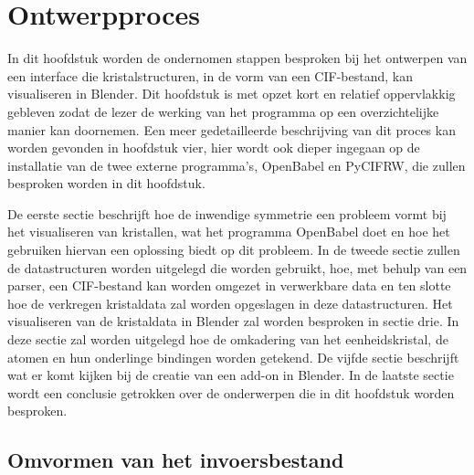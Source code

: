 

\chapter{Ontwerpproces}

In dit hoofdstuk worden de ondernomen stappen besproken bij het ontwerpen van een interface die kristalstructuren, in de vorm van een CIF-bestand, kan visualiseren in Blender. Dit hoofdstuk is met opzet kort en relatief oppervlakkig gebleven zodat de lezer de werking van het programma op een overzichtelijke manier kan doornemen. Een meer gedetailleerde beschrijving van dit proces kan worden gevonden in hoofdstuk vier, hier wordt ook dieper ingegaan op de installatie van de twee externe programma's, OpenBabel en PyCIFRW, die zullen besproken worden in dit hoofdstuk.
\par
De eerste sectie beschrijft hoe de inwendige symmetrie een probleem vormt bij het visualiseren van kristallen, wat het programma OpenBabel doet en hoe het gebruiken hiervan een oplossing biedt op dit probleem.
In de tweede sectie zullen de datastructuren worden uitgelegd die worden gebruikt, hoe, met behulp van een parser, een CIF-bestand kan worden omgezet in verwerkbare data en ten slotte  hoe de verkregen kristaldata zal worden opgeslagen in deze datastructuren.
Het visualiseren van de kristaldata in Blender zal worden besproken in sectie drie. In deze sectie zal worden uitgelegd hoe de omkadering van het eenheidskristal, de atomen en hun onderlinge bindingen worden getekend.
De vijfde sectie beschrijft wat er komt kijken bij de creatie van een add-on in Blender. 
In de laatste sectie wordt een conclusie getrokken over de onderwerpen die in dit hoofdstuk worden besproken.


\section{Omvormen van het invoersbestand}

